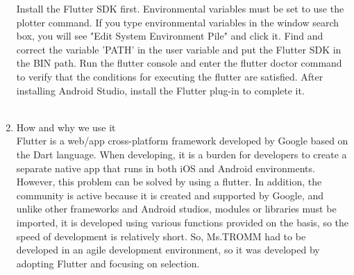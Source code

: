 \documentclass[conference]{IEEEtran}
\begin{document}
\begin{enumerate}
    Install the Flutter SDK first. Environmental variables must be set to use the plotter command. If you type environmental variables in the window search box, you will see "Edit System Environment Pile" and click it. Find and correct the variable 'PATH' in the user variable and put the Flutter SDK in the BIN path. Run the flutter console and enter the flutter doctor command to verify that the conditions for executing the flutter are satisfied. After installing Android Studio, install the Flutter plug-in to complete it.\\ \\
    \item How and why we use it \\
    Flutter is a web/app cross-platform framework developed by Google based on the Dart language. When developing, it is a burden for developers to create a separate native app that runs in both iOS and Android environments. However, this problem can be solved by using a flutter. In addition, the community is active because it is created and supported by Google, and unlike other frameworks and Android studios, modules or libraries must be imported, it is developed using various functions provided on the basis, so the speed of development is relatively short. So, Ms.TROMM had to be developed in an agile development environment, so it was developed by adopting Flutter and focusing on selection. \\ \\
\end{enumerate}
\end{document}
